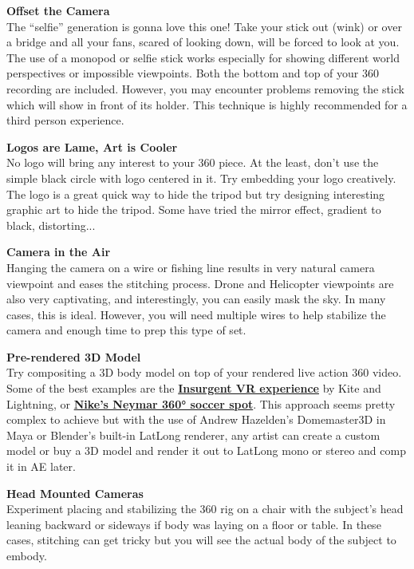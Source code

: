 \begin{fullwidth}

{\bfseries Offset the Camera}
\\
The “selfie” generation is gonna love this one! Take your stick out (wink) or over a bridge and all your fans, scared of looking down, will be forced to look at you. The use of a monopod or selfie stick works especially for showing different world perspectives or impossible viewpoints. Both the bottom and top of your 360 recording are included. However, you may encounter problems removing the stick which will show in front of its holder. This technique is highly recommended for a third person experience.


{\bfseries Logos are Lame, Art is Cooler}
\\
No logo will bring any interest to your 360 piece. At the least, don’t use the simple black circle with logo centered in it. Try embedding your logo creatively. The logo is a great quick way to hide the tripod but try designing interesting graphic art to hide the tripod. Some have tried the mirror effect, gradient to black, distorting... 

\clearpage
{\bfseries Camera in the Air}
\\
Hanging the camera on a wire or fishing line results in very natural camera viewpoint and eases the stitching process. Drone and Helicopter viewpoints are also very captivating, and interestingly, you can easily mask the sky. In many cases, this is ideal. However, you will need multiple wires to help stabilize the camera and enough time to prep this type of set.


{\bfseries Pre-rendered 3D Model}
\\
Try compositing a 3D body model on top of your rendered live action 360 video. Some of the best examples are the \textbf{\href{https://www.youtube.com/watch?v=OMxgo6zoAIM}{Insurgent VR experience}} by Kite and Lightning, or \textbf{\href{https://www.youtube.com/watch?v=bBZhuqPRx9c}{Nike's Neymar 360° soccer spot}}. This approach seems pretty complex to achieve but with the use of Andrew Hazelden's Domemaster3D in Maya or Blender's built-in LatLong renderer, any artist can create a custom model or buy a 3D model and render it out to LatLong mono or stereo and comp it in AE later.

\clearpage
{\bfseries Head Mounted Cameras}
\\
Experiment placing and stabilizing the 360 rig on a chair with the subject’s head leaning backward or sideways if body was laying on a floor or table. In these cases, stitching can get tricky but you will see the actual body of the subject to embody.


\end{fullwidth}
